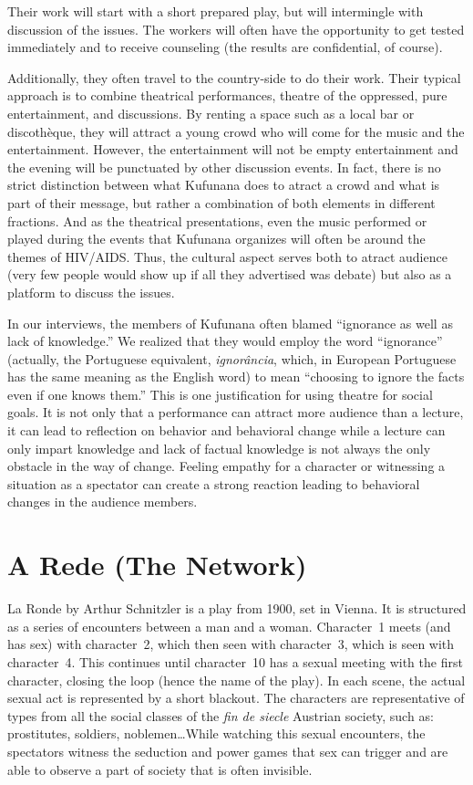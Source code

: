 \documentclass[article,twocolumn]{memoir}
\begin{document}
Their work will start with a short prepared play, but will intermingle with
discussion of the issues. The workers will often have the opportunity to get
tested immediately and to receive counseling (the results are confidential, of
course).

Additionally, they often travel to the country-side to do their work. Their
typical approach is to combine theatrical performances, theatre of the
oppressed, pure entertainment, and discussions. By renting a space such
as a local bar or discothèque, they will attract a young crowd who will come for
the music and the entertainment. However, the entertainment will not be empty
entertainment and the evening will be punctuated by other discussion events. In
fact, there is no strict distinction between what Kufunana does to atract a
crowd and what is part of their message, but rather a combination of both
elements in different fractions. And as the theatrical presentations, even the
music performed or played during the events that Kufunana organizes will often
be around the themes of HIV/AIDS. Thus, the cultural aspect serves both to
atract audience (very few people would show up if all they advertised was
debate) but also as a platform to discuss the issues.

In our interviews, the members of Kufunana often blamed ``ignorance as well as
lack of knowledge.'' We realized that they would employ the word ``ignorance''
(actually, the Portuguese equivalent, \textit{ignor\^{a}ncia}, which, in
European Portuguese has the same meaning as the English word) to mean
``choosing to ignore the facts even if one knows them.'' This is one
justification for using theatre for social goals. It is not only that a
performance can attract more audience than a lecture, it can lead to reflection
on behavior and behavioral change while a lecture can only impart knowledge and
lack of factual knowledge is not always the only obstacle in the way of change.
Feeling empathy for a character or witnessing a situation as a spectator can
create a strong reaction leading to behavioral changes in the audience members.

\chapter{A Rede (The Network)}

La Ronde by Arthur Schnitzler is a play from 1900, set in Vienna. It is
structured as a series of encounters between a man and a woman. Character~1
meets (and has sex) with character~2, which then seen with character~3, which
is seen with character~4. This continues until character~10 has a sexual
meeting with the first character, closing the loop (hence the name of the
play). In each scene, the actual sexual act is represented by a short blackout.
The characters are representative of types from all the social classes of the
\textit{fin de siecle} Austrian society, such as: prostitutes, soldiers,
noblemen\ldots While watching this sexual encounters, the spectators witness
the seduction and power games that sex can trigger and are able to observe a
part of society that is often invisible.
\end{document}
